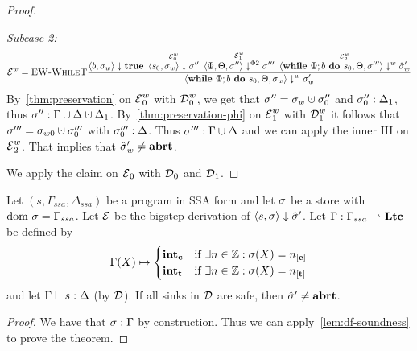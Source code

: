 \begin{proof}
\begin{claimproof}
        \emph{Subcase 2:}
        \begin{align*}
            \operatorname{\mathcal{E}}^w = \textsc{EW-WhileT}\frac{\displaystyle \overset{}{\langle b, \sigma_w \rangle \downarrow \textbf{true}} \enskip
            \overset{\operatorname{\mathcal{E}}^w_0}{\langle s_0, \sigma_w \rangle \downarrow \sigma''} \enskip
            \overset{\operatorname{\mathcal{E}}^w_1}{\langle \Phi, \Theta, \sigma'' \rangle \downarrow^{\Phi2} \sigma'''} \enskip
            \overset{\operatorname{\mathcal{E}}^w_2}{\langle \textbf{while }\Phi;{b} \textbf{ do } {s_0}, \Theta, \sigma''' \rangle \downarrow^w \hat{\sigma}'_w}}{\displaystyle \langle \textbf{while }\Phi;{b} \textbf{ do } {s_0}, \Theta, \sigma_w \rangle \downarrow^w \sigma_w'}
        \end{align*}
        By~\autoref{thm:preservation} on $\operatorname{\mathcal{E}}^w_0$ with $\operatorname{\mathcal{D}}^w_0$, we get that $\store'' = \store_w \dunion \store''_0$
        and ${\sigma''_0}:{\Delta_1}$, thus $\matches{\store''}{\Gamma \union \Delta \dunion \Delta_1}$.
        By~\autoref{thm:preservation-phi} on $\operatorname{\mathcal{E}}^w_1$ with $\operatorname{\mathcal{D}}_1^w$ it follows that $\store''' = \store_{w0} \dunion \store'''_0$
        with ${\sigma'''_0}:{\Delta}$.
        Thus ${\sigma'''}:{\Gamma \cup \Delta}$ and we can apply the inner IH on $\operatorname{\mathcal{E}}^w_2$.
        That implies that $\hat{\sigma}{}'_w \neq \textbf{abrt}$.
    \end{claimproof}
    We apply the claim on $\operatorname{\mathcal{E}}_0$ with $\operatorname{\mathcal{D}}_0$ and $\operatorname{\mathcal{D}}_1$.
\end{proof}

\begin{theorem}
    \label{thm:soundness-df}
    Let $(s, \Gamma_{ssa}, \Delta_{ssa})$ be a program in SSA form and let $\sigma$ be a store
    with $\text{dom }{\sigma} = \Gamma_{ssa}$.
    Let $\operatorname{\mathcal{E}}$ be the bigstep derivation of $\langle s, \sigma \rangle \downarrow \hat{\sigma}{}'$.
    Let $\Gamma: \Gamma_{ssa} \rightharpoonup \textbf{Ltc}$ be defined by
    \begin{align*}
        \Gamma(X) \mapsto \begin{cases}
            \lclean & \text{if $\exists n \in \Z: \store(X) = \clean$}\\
            \ltracked & \text{if $\exists n \in \Z: \store(X) = \tracked{}$}\\
        \end{cases}
    \end{align*}
    and let $\Gamma \vdash {s}: \Delta$ (by $\operatorname{\mathcal{D}}$).
    If all sinks in $\operatorname{\mathcal{D}}$ are safe, then $\hat{\sigma}{}' \neq \textbf{abrt}$.
\end{theorem}
\begin{proof}
    We have that ${\sigma}:{\Gamma}$ by construction.
    Thus we can apply~\autoref{lem:df-soundness} to prove the theorem.
\end{proof}

